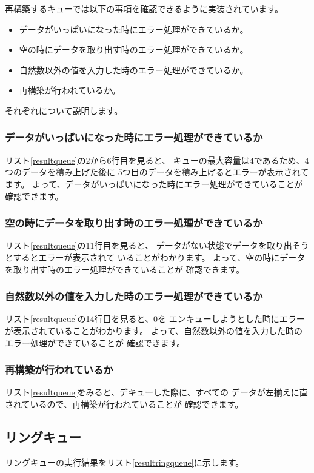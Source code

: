 \documentclass[a4j]{jarticle}
\begin{document}
再構築するキューでは以下の事項を確認できるように実装されています。
\begin{itemize}
  \item データがいっぱいになった時にエラー処理ができているか。
  \item 空の時にデータを取り出す時のエラー処理ができているか。
  \item 自然数以外の値を入力した時のエラー処理ができているか。
  \item 再構築が行われているか。
\end{itemize}

それぞれについて説明します。

\subsubsection{データがいっぱいになった時にエラー処理ができているか}
リスト\ref{resultqueue}の2から6行目を見ると、
キューの最大容量は4であるため、4つのデータを積み上げた後に
5つ目のデータを積み上げるとエラーが表示されてます。
よって、データがいっぱいになった時にエラー処理ができていることが
確認できます。

\subsubsection{空の時にデータを取り出す時のエラー処理ができているか}
リスト\ref{resultqueue}の11行目を見ると、
データがない状態でデータを取り出そうとするとエラーが表示されて
いることがわかります。
よって、空の時にデータを取り出す時のエラー処理ができていることが
確認できます。

\subsubsection{自然数以外の値を入力した時のエラー処理ができているか}
リスト\ref{resultqueue}の14行目を見ると、0を
エンキューしようとした時にエラーが表示されていることがわかります。
よって、自然数以外の値を入力した時のエラー処理ができていることが
確認できます。

\subsubsection{再構築が行われているか}
リスト\ref{resultqueue}をみると、デキューした際に、すべての
データが左揃えに直されているので、再構築が行われていることが
確認できます。

\subsection{リングキュー}
リングキューの実行結果をリスト\ref{resultringqueue}に示します。
\end{document}

